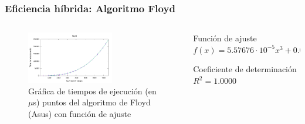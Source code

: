 \documentclass[8pt, aspectratio=169]{beamer}
\begin{document}
    \begin{frame}
        \frametitle{Eficiencia híbrida: Algoritmo Floyd}

        \begin{columns}
            \begin{column}{0.7\textwidth}
                \begin{figure}
                    \includegraphics[width=0.65\textwidth]{../data/asus/floyd-graph.pdf}
                    \caption{Gráfica de tiempos de ejecución (en $\mu$s) puntos del algoritmo de Floyd (Asus) con función de ajuste}
                \end{figure}
            \end{column}

            \begin{column}{0.3\textwidth}
                \begin{block}{Función de ajuste}
                    $f(x) = 5.57676 \cdot 10^{-5} x^3 + 0.00138722 x^2-0.315202 x + 34.0467$
                \end{block}

                \begin{block}{Coeficiente de determinación}
                    $R^2 = 1.0000$
                \end{block}
            \end{column}
        \end{columns}
    \end{frame}
\end{document}
